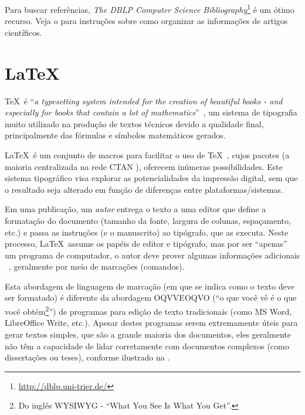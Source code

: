 Para buscar referências, \emph{The DBLP Computer Science Bibliography}\footnote{\url{http://dblp.uni-trier.de/}} 
é um ótimo recurso. Veja o  para instruções sobre 
	como organizar as informações de artigos científicos.



\section{\LaTeX}%

\TeX\ é ``\emph{a typesetting system intended for the creation of beautiful books
 - and especially for books that contain a lot of mathematics}''~\cite{Knuth_1986_texbook}, 
 um sistema de tipografia muito utilizado na produção de textos técnicos devido 
 a qualidade final, principalmente das fórmulas e símbolos matemáticos gerados.

\LaTeX\ é um conjunto de macros para facilitar o uso de \TeX~\cite{lamport_latex:_1994,}, 
cujos pacotes (a maioria centralizada na rede CTAN \cite{greenwade93}), oferecem 
inúmeras possibilidades. Este sistema tipográfico visa explorar as potencialidades 
da impressão digital, sem que o resultado seja alterado em função de diferenças 
entre plataformas/sistemas.

Em uma publicação, um \emph{autor} entrega o texto a uma editor que define a 
formatação do documento (tamanho da fonte, largura de colunas, espaçamento, etc.)
e passa as instruções (e o manuscrito) ao tipógrafo, que as executa. Neste processo,
\LaTeX\ assume os papéis de editor e tipógrafo, mas por ser ``apenas'' um programa 
de computador, o autor deve prover algumas informações adicionais ~\cite{Oetiker_1995_notsoshort},
geralmente por meio de marcações (comandos).

Esta abordagem de linguagem de marcação (em que se indica como o texto deve ser 
formatado) é diferente da abordagem OQVVEOQVO (``o que você vê é o que você 
obtém\footnote{Do inglês WYSIWYG - ``What You See Is What You Get''.}'') de programas 
para edição de texto tradicionais (como MS Word, LibreOffice Write, etc.).
Apesar destes programas serem extremamente úteis para gerar textos simples, que 
são a grande maioria dos documentos, eles geralmente não têm a capacidade de lidar 
corretamente com documentos complexos (como dissertações ou teses), conforme ilustrado 
na .

